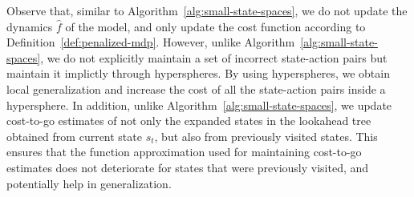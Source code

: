 Observe that, similar to Algorithm~\ref{alg:small-state-spaces}, we
do not update the dynamics $\hat{f}$ of the model, and only update the
cost function according to
Definition~\ref{def:penalized-mdp}. However, unlike
Algorithm~\ref{alg:small-state-spaces}, we do not explicitly maintain
a set of incorrect state-action pairs but maintain it implictly
through hyperspheres. By using hyperspheres, we obtain local
generalization and increase the cost of all the state-action pairs
inside a hypersphere.
In addition, unlike
Algorithm~\ref{alg:small-state-spaces}, we update cost-to-go estimates
of not only the expanded states in the lookahead tree obtained from
current state $s_t$, but also from previously visited states. This
ensures that the function approximation used for maintaining
cost-to-go estimates does not deteriorate for states that were
previously visited, and potentially help in generalization.
